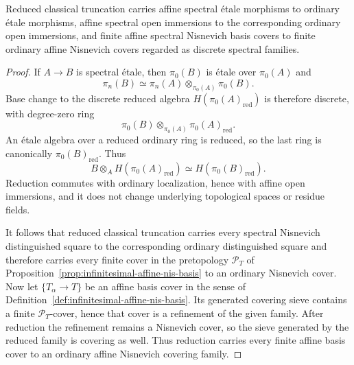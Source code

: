 \begin{lemma}
\label{lem:infinitesimal-reduction-nis}
Reduced classical truncation carries affine spectral \'etale morphisms to
ordinary \'etale morphisms, affine spectral open immersions to the
corresponding ordinary open immersions, and finite affine spectral Nisnevich
basis covers to finite ordinary affine Nisnevich covers regarded as discrete
spectral families.
\end{lemma}

\begin{proof}
If $A\to B$ is spectral \'etale, then $\pi_0(B)$ is \'etale over
$\pi_0(A)$ and
\[
    \pi_n(B)
    \simeq
    \pi_n(A)\otimes_{\pi_0(A)}\pi_0(B).
\]
Base change to the discrete reduced algebra $H(\pi_0(A)_{\mathrm{red}})$ is
therefore discrete, with degree-zero ring
\[
    \pi_0(B)\otimes_{\pi_0(A)}\pi_0(A)_{\mathrm{red}}.
\]
An \'etale algebra over a reduced ordinary ring is reduced, so the last ring
is canonically $\pi_0(B)_{\mathrm{red}}$.  Thus
\[
    B\otimes_AH(\pi_0(A)_{\mathrm{red}})
    \simeq
    H(\pi_0(B)_{\mathrm{red}}).
\]
Reduction commutes with ordinary localization, hence with affine open
immersions, and it does not change underlying topological spaces or residue
fields.

It follows that reduced classical truncation carries every spectral
Nisnevich distinguished square to the corresponding ordinary distinguished
square and therefore carries every finite cover in the pretopology
$\mathcal P_T$ of Proposition~\ref{prop:infinitesimal-affine-nis-basis} to an
ordinary Nisnevich cover.  Now let $\{T_\alpha\to T\}$ be an affine basis
cover in the sense of Definition~\ref{def:infinitesimal-affine-nis-basis}.
Its generated covering sieve contains a finite $\mathcal P_T$-cover, hence
that cover is a refinement of the given family.  After reduction the
refinement remains a Nisnevich cover, so the sieve generated by the reduced
family is covering as well.  Thus reduction carries every finite affine basis
cover to an ordinary affine Nisnevich covering family.
\end{proof}

